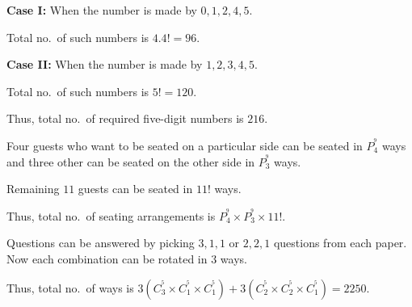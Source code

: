   {\bf Case I:} When the number is made by $0, 1, 2, 4, 5$.

  Total no.\ of such numbers is $4.4! = 96$.

  {\bf Case II:} When the number is made by $1, 2, 3, 4, 5$.

  Total no.\ of such numbers is $5! = 120$.

  Thus, total no.\ of required five-digit numbers is $216$.
\item Four guests who want to be seated on a particular side can be seated in $P_4^^9$ ways and three other
  can be seated on the other side in $P_3^^9$ ways.

  Remaining $11$ guests can be seated in $11!$ ways.

  Thus, total no.\ of seating arrangements is $P_4^^9\times P_3^^9\times11!$.
\item Questions can be answered by picking $3, 1, 1$ or $2, 2, 1$ questions from each paper. Now each
  combination can be rotated in $3$ ways.

  Thus, total no.\ of ways is $3\left(C_3^^5\times C_1^^5\times C_1^^5\right) + 3\left(C_2^^5\times
  C_2^^5\times C_1^^5\right) = 2250$.
\stopitemize
